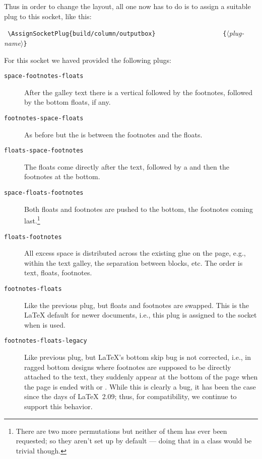 \documentclass{ltnews}
\providecommand\plug[1]{\texttt{#1}}
\providecommand\meta[1]{$\langle$\textrm{\itshape#1}$\rangle$}
\begin{document}
Thus in order to change the layout, all one now 
has to do is to assign a suitable
plug to this socket, like this:
\begin{flushleft}
  \verb= \AssignSocketPlug{build/column/outputbox}=
  \verb=                  {=\meta{plug-name}\verb=}=
\end{flushleft}
%
For this socket we haved provided the following plugs:
\begin{description}
\item[\plug{space-footnotes-floats}]

   After the galley text there is a vertical 
   followed by the footnotes, followed by the bottom floats, if any.

\item[\plug{footnotes-space-floats}]

   As before but the  is between the footnotes and the floats.

\item[\plug{floats-space-footnotes}]

   The floats come directly after the text, followed by a  and then the footnotes
   at the bottom.

\item[\plug{space-floats-footnotes}]

   Both floats and footnotes are pushed to the bottom, the footnotes
   coming last.\footnote{There are two more permutations but neither
   of them has ever been requested; so they aren't set up by default
   --- doing that in a class would be trivial though.}

\item[\plug{floats-footnotes}]

   All excess space is distributed across the existing
   glue on the page, e.g., within the text galley, the
   separation between blocks, etc.
   The order is text, floats, footnotes.

\item[\plug{footnotes-floats}]

   Like the previous plug, but floats and footnotes are swapped. This is
   the \LaTeX{} default for newer documents, i.e., this plug is
   assigned to the socket when  is used.

\item[\plug{footnotes-floats-legacy}]

   Like previous plug, but \LaTeX{}'s bottom skip bug is not
   corrected, i.e., in ragged bottom designs where footnotes
   are supposed to be directly attached to the text, they suddenly
   appear at the bottom of the page when the page is ended with
    or .
   While this is clearly a bug, it has been the case since the days
   of \LaTeX~2.09; thus, for
   compatibility, we continue to support this behavior.
\end{description}
\end{document}
